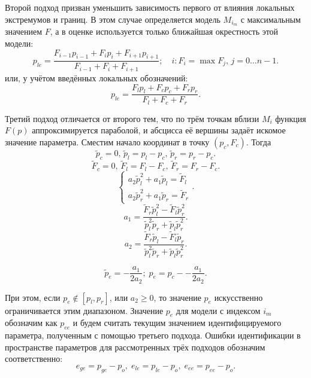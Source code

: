 Второй подход призван уменьшить зависимость первого
от влияния локальных экстремумов и границ. В этом
случае определяется модель $M_{i_{m}}$ с максимальным значением
$F$, а в оценке используется только ближайшая окрестность этой модели:
%
\begin{equation}
  p_{le}
  =
  \frac{ F_{i-1} p_{i-1} + F_{i} p_{i} + F_{i+1} p_{i+1} }
       { F_{i-1}         + F_{i}       + F_{i+1}         }
  ;
  \quad
  i : F_i = \max{F_j}, \, j=0 \ldots n-1.
  \label{atu:eq:p_le}
\end{equation}
%
или, у учётом введённых локальных обозначений:
%
\begin{equation}
  p_{le}
  =
  \frac{ F_{l} p_{l} + F_{c} p_{c} + F_{r} p_{r} }
       { F_{l}       + F_{c}       + F_{r}       }
  .
  \label{atu:eq:p_lel}
\end{equation}

Третий подход отличается от второго тем, что по трём точкам вблизи  $M_{i}$
функция $F(p)$ аппроксимируется параболой, и абсцисса её вершины задаёт искомое
значение параметра. Сместим начало координат в точку
$ ( p_c, F_c ) $. Тогда
%
\[
  \tilde{p}_c = 0, \,
  \tilde{p}_l = p_l - p_c, \,
  \tilde{p}_r = p_r - p_c.
\]
%
\[
  \tilde{F}_c = 0, \,
  \tilde{F}_l = F_l - F_c, \,
  \tilde{F}_r = F_r - F_c.
\]
%
\[
  \left\{
    \begin{array}{l}
      a_2 \tilde{p}_l^2 + a_1 \tilde{p}_l  = \tilde{F}_l
      \\
      a_2 \tilde{p}_r^2 + a_1 \tilde{p}_r  = \tilde{F}_r
    \end{array}
  \right. .
\]
%
\[
  a_1 = \frac{\tilde{F}_r \tilde{p}_l^2 - \tilde{F}_l \tilde{p}_r^2 }
             { \tilde{p}_l^2 \tilde{p}_r  + \tilde{p}_l \tilde{p}_r^2 }.
\]
%
\[
  a_2 = \frac{\tilde{F}_r \tilde{p}_l - \tilde{F}_l \tilde{p}_r }
             { \tilde{p}_l^2 \tilde{p}_r  + \tilde{p}_l \tilde{p}_r^2 }.
\]

\begin{equation}
  \tilde{p}_e = - \frac{a_1}{2 a_2};
  \;
  p_e = p_c -- \frac{a_1}{2 a_2}.
  \label{atu:eq:p_e}
\end{equation}


При этом, если
$ p_e \notin [ p_l, p_r ] $, или $ a_2 \ge 0 $, то значение $p_e$ искусственно
ограничивается этим диапазоном. Значение $p_e$ для модели с индексом
$i_m$ обозначим как $p_{ee}$ и будем считать
текущим значением идентифицируемого параметра, полученным с помощью
третьего подхода. Ошибки идентификации в пространстве параметров
для рассмотренных трёх подходов обозначим соответственно:
%
\begin{equation}
  e_{ge} = p_{ge} - p_o, \;
  e_{le} = p_{le} - p_o, \;
  e_{ee} = p_{ee} - p_o.
  \label{atu:eq:e_xx}
\end{equation}


